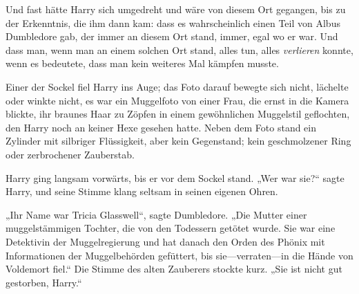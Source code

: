 Und fast hätte Harry sich umgedreht und wäre von diesem Ort gegangen, bis zu der Erkenntnis, die ihm dann kam: dass es wahrscheinlich einen Teil von Albus Dumbledore gab, der immer an diesem Ort stand, immer, egal wo er war. Und dass man, wenn man an einem solchen Ort stand, alles tun, alles \emph{verlieren} konnte, wenn es bedeutete, dass man kein weiteres Mal kämpfen musste.

Einer der Sockel fiel Harry ins Auge; das Foto darauf bewegte sich nicht, lächelte oder winkte nicht, es war ein Muggelfoto von einer Frau, die ernst in die Kamera blickte, ihr braunes Haar zu Zöpfen in einem gewöhnlichen Muggelstil geflochten, den Harry noch an keiner Hexe gesehen hatte. Neben dem Foto stand ein Zylinder mit silbriger Flüssigkeit, aber kein Gegenstand; kein geschmolzener Ring oder zerbrochener Zauberstab.

Harry ging langsam vorwärts, bis er vor dem Sockel stand. „Wer war sie?“ sagte Harry, und seine Stimme klang seltsam in seinen eigenen Ohren.

„Ihr Name war Tricia Glasswell“, sagte Dumbledore. „Die Mutter einer muggelstämmigen Tochter, die von den Todessern getötet wurde. Sie war eine Detektivin der Muggelregierung und hat danach den Orden des Phönix mit Informationen der Muggelbehörden gefüttert, bis sie—verraten—in die Hände von Voldemort fiel.“ Die Stimme des alten Zauberers stockte kurz. „Sie ist nicht gut gestorben, Harry.“

